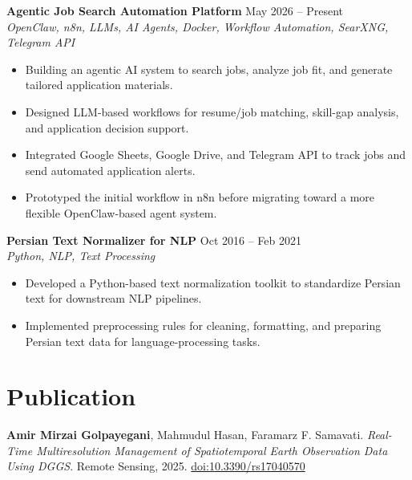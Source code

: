 \documentclass[a4paper,10pt]{article}
\newcommand{\resumeSubheading}[4]{
    \textbf{#1} \hfill #2 \\
    \textit{#3} \hfill \textit{#4}
}
\begin{document}
\noindent
\textbf{Agentic Job Search Automation Platform} \hfill May 2026 -- Present \\
\textit{OpenClaw, n8n, LLMs, AI Agents, Docker, Workflow Automation, SearXNG, Telegram API}
\begin{itemize}[leftmargin=0.25in]
    \item Building an agentic AI system to search jobs, analyze job fit, and generate tailored application materials.
    \item Designed LLM-based workflows for resume/job matching, skill-gap analysis, and application decision support.
    \item Integrated Google Sheets, Google Drive, and Telegram API to track jobs and send automated application alerts.
    \item Prototyped the initial workflow in n8n before migrating toward a more flexible OpenClaw-based agent system.
\end{itemize}

\noindent
\textbf{Persian Text Normalizer for NLP} \hfill Oct 2016 -- Feb 2021 \\
\textit{Python, NLP, Text Processing}
\begin{itemize}[leftmargin=0.25in]
    \item Developed a Python-based text normalization toolkit to standardize Persian text for downstream NLP pipelines.
    \item Implemented preprocessing rules for cleaning, formatting, and preparing Persian text data for language-processing tasks.
\end{itemize}

\section*{Publication}

\textbf{Amir Mirzai Golpayegani}, Mahmudul Hasan, Faramarz F. Samavati. 
\textit{Real-Time Multiresolution Management of Spatiotemporal Earth Observation Data Using DGGS}. 
Remote Sensing, 2025. \href{https://doi.org/10.3390/rs17040570}{doi:10.3390/rs17040570}



\end{document}
